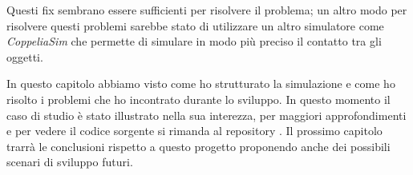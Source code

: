 Questi fix sembrano essere sufficienti per risolvere il problema; un altro modo per risolvere questi problemi sarebbe stato di utilizzare un altro simulatore come \textit{CoppeliaSim} che permette di simulare in modo più preciso il contatto tra gli oggetti.

In questo capitolo abbiamo visto come ho strutturato la simulazione e come ho risolto i problemi che ho incontrato durante lo sviluppo. In questo momento il caso di studio è stato illustrato nella sua interezza, per maggiori approfondimenti e per vedere il codice sorgente si rimanda al repository \cite{gitrepo}. 
Il prossimo capitolo trarrà le conclusioni rispetto a questo progetto proponendo anche dei possibili scenari di sviluppo futuri.

